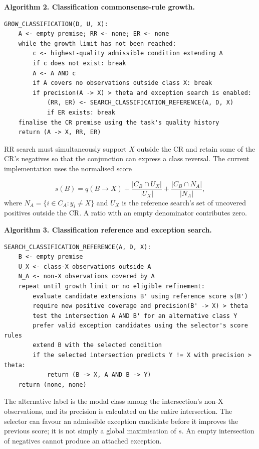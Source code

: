 \noindent\begin{minipage}{\linewidth}
\textbf{Algorithm 2. Classification commonsense-rule growth.}


\begin{Verbatim}[fontsize=\scriptsize,frame=single,samepage=true]
GROW_CLASSIFICATION(D, U, X):
    A <- empty premise; RR <- none; ER <- none
    while the growth limit has not been reached:
        c <- highest-quality admissible condition extending A
        if c does not exist: break
        A <- A AND c
        if A covers no observations outside class X: break
        if precision(A -> X) > theta and exception search is enabled:
            (RR, ER) <- SEARCH_CLASSIFICATION_REFERENCE(A, D, X)
            if ER exists: break
    finalise the CR premise using the task's quality history
    return (A -> X, RR, ER)
\end{Verbatim}
\end{minipage}
RR search must simultaneously support \(X\) outside the CR and retain some
of the CR's negatives so that the conjunction can express a class reversal. The current implementation
uses the normalised score


\[
s(B)=q(B\to X)
   +\frac{|C_B\cap U_X|}{|U_X|}
   +\frac{|C_B\cap N_A|}{|N_A|},
\]
where \(N_A=\{i\in C_A:y_i\ne X\}\) and \(U_X\) is the reference
search's set of uncovered positives outside the CR. A ratio with an empty
denominator contributes zero. 

\noindent\begin{minipage}{\linewidth}
\textbf{Algorithm 3. Classification reference and exception search.}


\begin{Verbatim}[fontsize=\scriptsize,frame=single,samepage=true]
SEARCH_CLASSIFICATION_REFERENCE(A, D, X):
    B <- empty premise
    U_X <- class-X observations outside A
    N_A <- non-X observations covered by A
    repeat until growth limit or no eligible refinement:
        evaluate candidate extensions B' using reference score s(B')
        require new positive coverage and precision(B' -> X) > theta
        test the intersection A AND B' for an alternative class Y
        prefer valid exception candidates using the selector's score rules
        extend B with the selected condition
        if the selected intersection predicts Y != X with precision > theta:
            return (B -> X, A AND B -> Y)
    return (none, none)
\end{Verbatim}
\end{minipage}
The alternative label is the modal class among the intersection's non-X
observations, and its precision is calculated on the entire intersection.
The selector can favour an admissible exception candidate before it improves
the previous score; it is not simply a global maximisation of \(s\).
An empty intersection of negatives cannot produce an attached exception.


